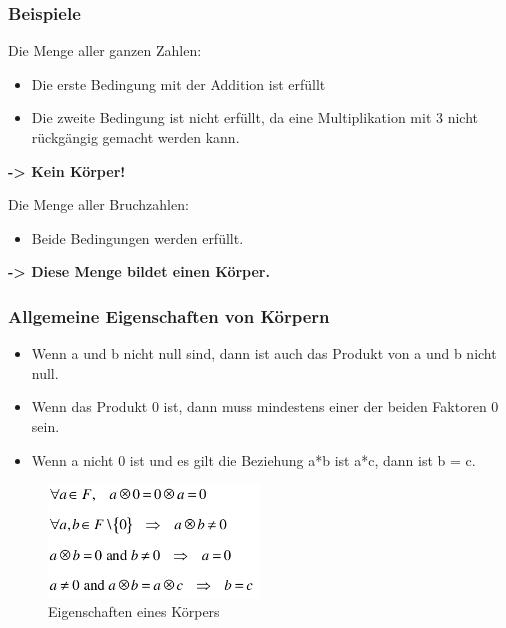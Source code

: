 \hypertarget{beispiele}{%
\subsubsection{Beispiele}\label{beispiel}}

Die Menge aller ganzen Zahlen: 
\begin{itemize}
    \item Die erste Bedingung mit der Addition ist erfüllt
    \item Die zweite Bedingung ist nicht erfüllt, da eine Multiplikation mit 3 nicht rückgängig gemacht werden kann.
\end{itemize}
\textbf{-> Kein Körper!}

Die Menge aller Bruchzahlen:
\begin{itemize}
    \item Beide Bedingungen werden erfüllt.
\end{itemize}
\textbf{-> Diese Menge bildet einen Körper.}

\hypertarget{allgemeine-eigenschaften-von-kuxf6rpern}{%
\subsubsection{Allgemeine Eigenschaften von
Körpern}\label{allgemeine-eigenschaften-von-kuxf6rpern}}

\begin{itemize}
\tightlist
\item
  Wenn a und b nicht null sind, dann ist auch das Produkt von a und b  nicht null.
\item
  Wenn das Produkt 0 ist, dann muss mindestens einer der beiden Faktoren 0 sein.
\item
  Wenn a nicht 0 ist und es gilt die Beziehung a*b ist a*c, dann ist b =
  c.
\end{itemize}


\begin{figure}[H]
\centering
\includegraphics[width=0.5\textwidth]{figures/propertiesOfFields.png}
\caption{Eigenschaften eines Körpers}
\end{figure}


